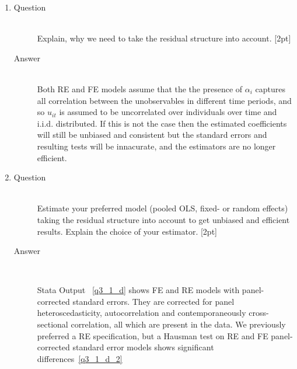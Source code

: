 \documentclass{article}
\begin{document}
\begin{enumerate}
\begin{enumerate}[label=(\alph*)]
    
    \item 
    \begin{description}
      \item[Question] \hfill \\
      Explain, why we need to take the residual structure into account. [2pt]
      \item[Answer] \hfill \\
      Both RE and FE models assume that the the presence of \(\alpha_i\) captures all correlation between the unobservables in different time periods, and so \(u_{it}\) is assumed to be uncorrelated over individuals over time and i.i.d. distributed. If this is not the case then the estimated coefficients will still be unbiased and consistent but the standard errors and resulting tests will be innacurate, and the estimators are no longer efficient.
    \end{description}
    \item 
    \begin{description}
      \item[Question] \hfill \\
      Estimate your preferred model (pooled OLS, fixed- or random effects) taking the residual structure into account to get unbiased and efficient results. Explain the choice of your estimator. [2pt]
      \item[Answer] \hfill \\
      \begin{figure}
      
      \end{figure}
      Stata Output ~\ref{q3_1_d} shows FE and RE models with panel-corrected standard errors. They are corrected for panel heteroscedasticity, autocorrelation and contemporaneously cross-sectional correlation, all which are present in the data. We previously preferred a RE specification, but a Hausman test on RE and FE panel-corrected standard error models shows significant differences~\ref{q3_1_d_2}
      \begin{figure}
      
      \end{figure}
    \end{description}
    

\end{enumerate}
\end{enumerate}
\end{document}
